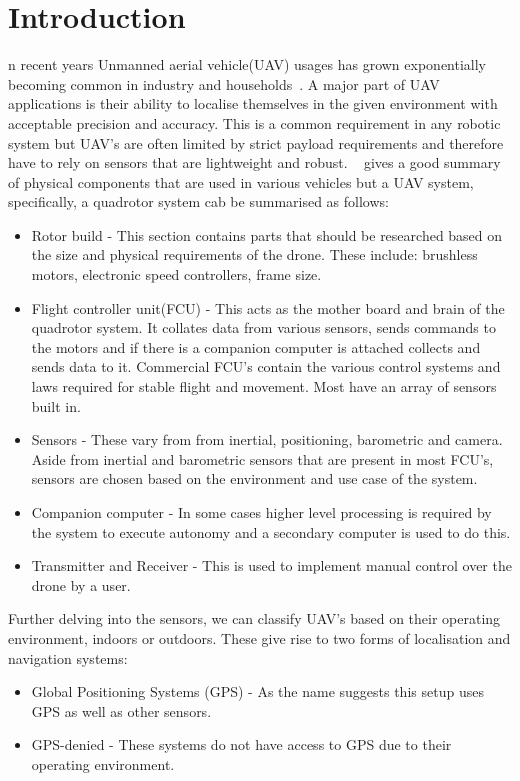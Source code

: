 \let\textcircled=\pgftextcircled
\chapter{Introduction}\label{ch:intro}%
    n recent years Unmanned aerial vehicle(UAV) usages has grown exponentially becoming common in industry and households~\cite{custers2016drones}.
    A major part of UAV applications is their ability to localise themselves in the given environment with acceptable precision and accuracy.
    This is a common requirement in any robotic system but UAV's are often limited by strict payload requirements and therefore have to rely on sensors that are lightweight and robust.
    ~\citep{ardupilotadvanced} gives a good summary of physical components that are used in various vehicles but a UAV system, specifically, a quadrotor system cab be summarised as follows:
    \begin{itemize}
        \item Rotor build - This section contains parts that should be researched based on the size and physical requirements of the drone.
        These include: brushless motors, electronic speed controllers, frame size.
        \item Flight controller unit(FCU) - This acts as the mother board and brain of the quadrotor system.
        It collates data from various sensors, sends commands to the motors and if there is a companion computer is attached collects and sends data to it.
        Commercial FCU's contain the various control systems and laws required for stable flight and movement.
        Most have an array of sensors built in.
        \item Sensors - These vary from from inertial, positioning, barometric and camera.
        Aside from inertial and barometric sensors that are present in most FCU's, sensors are chosen based on the environment and use case of the system.
        \item Companion computer - In some cases higher level processing is required by the system to execute autonomy and a secondary computer is used to do this.
        \item Transmitter and Receiver - This is used to implement manual control over the drone by a user.
    \end{itemize}

Further delving into the sensors, we can classify UAV's based on their operating environment, indoors or outdoors.
These give rise to two forms of localisation and navigation systems:
    \begin{itemize}
        \item Global Positioning Systems (GPS) - As the name suggests this setup uses GPS as well as other sensors.
        \item GPS-denied - These systems do not have access to GPS due to their operating environment.
    \end{itemize}

